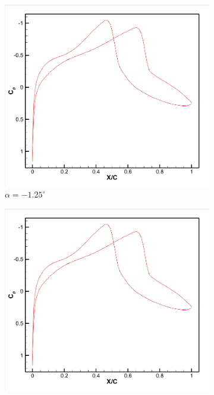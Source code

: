 \begin{figure}[H]
\centering
\captionsetup[subfigure]{font=scriptsize} %
\begin{subfigure}[b]{0.18\textwidth}
\centering
\includegraphics[width=\linewidth]{1.png}
\caption{$\alpha=-1.25^\circ$}
\end{subfigure}
\hfill
\begin{subfigure}[b]{0.18\textwidth}
\centering
\includegraphics[width=\linewidth]{2.png}

\end{subfigure}
\end{figure}
